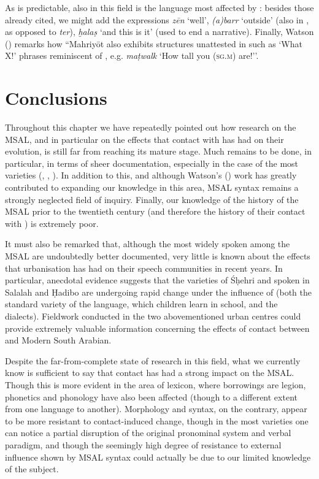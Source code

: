 \documentclass[output=paper]{langsci/langscibook}
\begin{document}
As is predictable, also in this field  is the language most affected by : besides those already cited, we might add the expressions \textit{zēn} ‘well’, \textit{(a)barr} ‘outside’ (also in , as opposed to  \textit{ter}), \textit{ḫalaṣ} ‘and this is it’ (used to end a narrative). Finally, Watson (\citeyear[3]{Watson2012}) remarks how ``Mahriyōt also exhibits structures unattested in  such as ‘What X!’ phrases reminiscent of , e.g. \textit{maṭwalk} ‘How tall you (\textsc{sg.m}) are!’’.

\section{Conclusions}\label{sec:4}

Throughout this chapter we have repeatedly pointed out how research on the MSAL, and in particular on the effects that contact with  has had on their evolution, is still far from reaching its mature stage. Much remains to be done, in particular, in terms of sheer documentation, especially in the case of the most  varieties (, , ). In addition to this, and although Watson’s (\citeyear{Watson2012}) work has greatly contributed to expanding our knowledge in this area, MSAL syntax remains a strongly neglected field of inquiry. Finally, our knowledge of the history of the MSAL prior to the twentieth century (and therefore the history of their contact with ) is extremely poor. 

It must also be remarked that, although the most widely spoken among the MSAL are undoubtedly better documented, very little is known about the effects that urbanisation has had on their speech communities in recent years. In particular, anecdotal evidence suggests that the varieties of Śḥehri and  spoken in Salalah and Ḥadibo are undergoing rapid change under the influence of  (both the standard variety of the language, which children learn in school, and the dialects). Fieldwork conducted in the two abovementioned urban centres could provide extremely valuable information concerning the effects of contact between  and Modern South Arabian.

Despite the far-from-complete state of research in this field, what we currently know is sufficient to say that contact has had a strong impact on the MSAL. Though this is more evident in the area of lexicon, where borrowings are legion, phonetics and phonology have also been affected (though to a different extent from one language to another). Morphology and syntax, on the contrary, appear to be more resistant to contact-induced change, though in the most  varieties one can notice a partial disruption of the original pronominal system and verbal paradigm, and though the seemingly high degree of resistance to external influence shown by MSAL syntax could actually be due to our limited knowledge of the subject.
\end{document}

